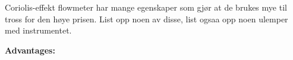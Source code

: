 


Coriolis-effekt flowmeter har mange egenskaper som gjør at de brukes mye til tross for den høye prisen. List opp noen av disse, list ogs{aa} opp noen ulemper med instrumentet.







{\bf Advantages:}

